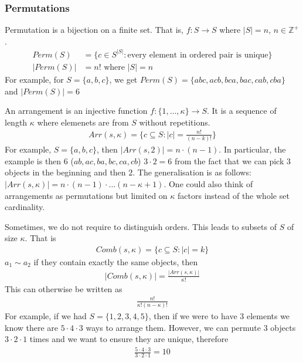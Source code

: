\documentclass[a4paper]{article}
\theoremstyle{plain}
\theoremstyle{definition}
\newtheorem{defn}{Definition}[section]
\theoremstyle{remark}
\begin{document}
\subsubsection{Permutations}
\begin{tcolorbox}[colback=black!3!white,colframe=black!60!white,title=\begin{defn}Permutation \label{Permutation}\end{defn}]
Permutation is a bijection on a finite set. That is, $f:S \to S$ where $|S| =n$, $n \in \mathbb{Z}^{+}$.
\begin{align}
	Perm(S) &= \{ c \in S^{|S|} : \text{every element in ordered pair is unique} \} \\
	|Perm(S)| &= n! \text{ where $|S| = n$}
\end{align}
For example, for $S = \{a,b,c\}$, we get $Perm(S) = \{abc, acb, bca, bac, cab, cba \}$ and $|Perm(S)| = 6$
\end{tcolorbox}
\begin{tcolorbox}[colback=black!3!white,colframe=black!60!white,title=\begin{defn}Arrangements \label{Arrangements}\end{defn}]
An arrangement is an injective function $f: \{1,\ldots,\kappa \} \to S$. It is a sequence of length $\kappa$ where elemenets are from $S$ without repetitions.
\begin{align}
	Arr(s,\kappa) = \{ c \subseteq S : |c|=\frac{n!}{(n-k)!}\}
\end{align}
For example, $S = \{a,b,c\}$, then $|Arr(s,2)|=n\cdot (n-1)$. In particular, the example is then $6$ ($ab,ac,ba,bc,ca,cb$) $3 \cdot 2 = 6$ from the fact that we can pick $3$ objects in the beginning and then $2$. The generalisation is as follows:  $|Arr(s,\kappa)| = n \cdot (n-1) \cdot \ldots (n-\kappa+1)$. One could also think of arrangements as permutations but limited on $\kappa$ factors instead of the whole set cardinality.
\end{tcolorbox}
\begin{tcolorbox}[colback=black!3!white,colframe=black!60!white,title=\begin{defn}Combinations \label{Combinations}\end{defn}]
Sometimes, we do not require to distinguish orders. This leads to subsets of $S$ of size $\kappa$. That is
\begin{align}
	Comb(s,\kappa ) = \{ c \subseteq S : |c| = k \}
\end{align}
$a_1 \sim a_2$ if they contain exactly the same objects, then
\begin{align}
	|Comb(s,\kappa)| = \frac{|Arr(s,\kappa)|}{\kappa!}
\end{align}
This can otherwise be written as 
\begin{align}
	\frac{n!}{\kappa!(n-\kappa)!}
\end{align}
For example, if we had $S = \{1,2,3,4,5\}$, then if we were to have $3$ elements
we know there are $5 \cdot 4 \cdot 3$ ways to arrange them. However, we can permute  $3$ objects $3\cdot 2\cdot1$ times and we want to ensure they are unique, therefore
\begin{align*}
	\frac{5\cdot 4 \cdot 3}{ 3 \cdot 2 \cdot 1} = 10
\end{align*}
\end{tcolorbox}
\end{document}
